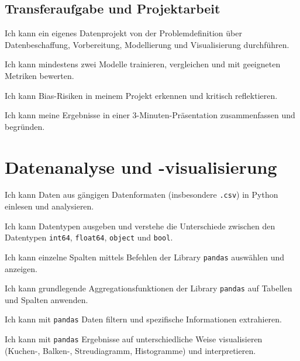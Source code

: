 \section{Transferaufgabe und Projektarbeit}
\begin{todolist}
    \item Ich kann ein eigenes Datenprojekt von der Problemdefinition über Datenbeschaffung, Vorbereitung, Modellierung und Visualisierung durchführen.
    \item Ich kann mindestens zwei Modelle trainieren, vergleichen und mit geeigneten Metriken bewerten.
    \item Ich kann Bias-Risiken in meinem Projekt erkennen und kritisch reflektieren.
    \item Ich kann meine Ergebnisse in einer 3-Minuten-Präsentation zusammenfassen und begründen.
\end{todolist}

\chapter{Datenanalyse und -visualisierung}
\begin{todolist}
  \item Ich kann Daten aus gängigen Datenformaten (insbesondere \texttt{.csv}) in Python einlesen und analysieren.
  \item Ich kann Datentypen ausgeben und verstehe die Unterschiede zwischen den Datentypen \texttt{int64}, \texttt{float64}, \texttt{object} und \texttt{bool}.
  \item Ich kann einzelne Spalten mittels Befehlen der Library \texttt{pandas} auswählen und anzeigen.
  \item Ich kann grundlegende Aggregationsfunktionen der Library \texttt{pandas} auf Tabellen und Spalten anwenden.
  \item Ich kann mit \texttt{pandas} Daten filtern und spezifische Informationen extrahieren.
  \item Ich kann mit \texttt{pandas} Ergebnisse auf unterschiedliche Weise visualisieren (Kuchen-, Balken-, Streudiagramm, Histogramme) und interpretieren.
\end{todolist}